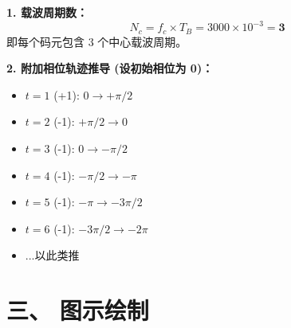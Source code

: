 \documentclass[a4paper,11pt]{ctexart}
\begin{document}
    \textbf{1. 载波周期数：}
    $$ N_c = f_c \times T_B = 3000 \times 10^{-3} = \mathbf{3} $$
    即每个码元包含 3 个中心载波周期。
    
    \textbf{2. 附加相位轨迹推导 (设初始相位为 0)：}
    \begin{itemize}
        \item $t=1$ (+1): $0 \to +\pi/2$
        \item $t=2$ (-1): $+\pi/2 \to 0$
        \item $t=3$ (-1): $0 \to -\pi/2$
        \item $t=4$ (-1): $-\pi/2 \to -\pi$
        \item $t=5$ (-1): $-\pi \to -3\pi/2$
        \item $t=6$ (-1): $-3\pi/2 \to -2\pi$
        \item ...以此类推
    \end{itemize}

    \hrulefill
    
    \section*{三、 图示绘制}
\end{document}
